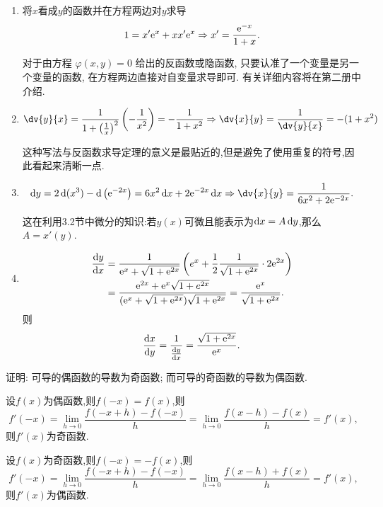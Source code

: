 \begin{solution}
    \begin{enumerate}
        \item 将$x$看成$y$的函数并在方程两边对$y$求导
              $$1 = x'\mathrm{e}^x + x x' \mathrm{e}^x \Rightarrow x' = \frac{\mathrm{e}^{-x}}{1+x}.$$
              \begin{remark}
                  对于由方程 $\varphi(x,y) = 0$ 给出的反函数或隐函数, 只要认准了一个变量是另一个变量的函数, 在方程两边直接对自变量求导即可. 有关详细内容将在第二册中介绍.
              \end{remark}
        \item $$\dv{y}{x} = \frac{1}{1+ \left(\frac{1}{x}\right)^2} \left( - \frac{1}{x^2} \right) = - \frac{1}{1+x^2} \Rightarrow \dv{x}{y} =
                  \frac{1}{\dv{y}{x}} = -(1+x^2)$$
              \begin{remark}
                  这种写法与反函数求导定理的意义是最贴近的,但是避免了使用重复的符号,因此看起来清晰一点.
              \end{remark}
        \item $$\dif y = 2 \diff(x^3) - \diff\left(\e^{-2x} \right) = 6x^2 \dif x + 2\e^{-2x} \dif x \Rightarrow \dv{x}{y} = \frac{1}{6x^2 + 2\e^{-2x}}.$$
              \begin{remark}
                  这在利用3.2节中微分的知识:若$y(x)$可微且能表示为$\operatorname{d\!} x = A \operatorname{d\!} y$,那么$A=x'(y)$.
              \end{remark}
        \item \begin{align*}
                  \dfrac{\operatorname{d\!} y}{\operatorname{d\!} x} & = \dfrac{1}{\mathrm{e}^x + \sqrt{1+\mathrm{e}^{2x}}} \left( e^x + \dfrac{1}{2} \dfrac{1}{\sqrt{1+\mathrm{e}^{2x}}} \cdot 2\mathrm{e}^{2x} \right)     \\
                                         & = \dfrac{\mathrm{e}^{2x} + \mathrm{e}^x \sqrt{1+e^{2x}}}{(\mathrm{e}^x + \sqrt{1+\mathrm{e}^{2x}})\sqrt{1+\mathrm{e}^{2x}}} = \dfrac{\mathrm{e}^x}{\sqrt{1+\mathrm{e}^{2x}}}.
              \end{align*}
              则$$\dfrac{\operatorname{d\!} x}{\operatorname{d\!} y} = \dfrac{1}{\frac{\operatorname{d\!} y}{\operatorname{d\!} x}} = \dfrac{\sqrt{1+\mathrm{e}^{2x}}}{\mathrm{e}^x}.$$
    \end{enumerate}
\end{solution}

\begin{exercise}[3.1.15]
    证明: 可导的偶函数的导数为奇函数; 而可导的奇函数的导数为偶函数.
\end{exercise}

\begin{solution}
    设$f(x)$为偶函数,则$f(-x) = f(x)$,则$$f'(-x) = \lim_{h \to 0} \dfrac{f(-x+h) - f(-x)}{h} = \lim_{h \to 0} \dfrac{f(x-h) - f(x)}{h} = f'(x),$$则$f'(x)$为奇函数.

    设$f(x)$为奇函数,则$f(-x) = -f(x)$,则$$f'(-x) = \lim_{h \to 0} \dfrac{f(-x+h) - f(-x)}{h} = \lim_{h \to 0} \dfrac{f(x-h) + f(x)}{h} = f'(x),$$则$f'(x)$为偶函数.
\end{solution}

